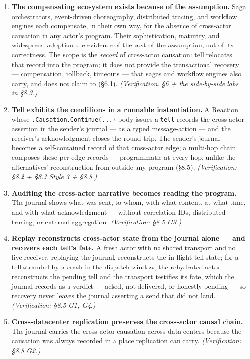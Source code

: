\documentclass[
]{article}
\let\origtexttt\texttt%
\renewcommand{\texttt}[1]{\origtexttt{\seqsplit{#1}}}%
\let\texttt\origtexttt%
\begin{document}
\begin{enumerate}
  remain unchanged; only the historical interpretation of what each
  actor's program is \emph{permitted to say} is removed.
  \emph{(Verification: §7.3.)}
\item
  \textbf{The compensating ecosystem exists because of the assumption.}
  Saga orchestrators, event-driven choreography, distributed tracing,
  and workflow engines each compensate, in their own way, for the
  absence of cross-actor causation in any actor's program. Their
  sophistication, maturity, and widespread adoption are evidence of the
  cost of the assumption, not of its correctness. The scope is the
  \emph{record} of cross-actor causation: tell relocates that record
  into the program; it does not provide the transactional recovery ---
  compensation, rollback, timeouts --- that sagas and workflow engines
  also carry, and does not claim to (§6.1). \emph{(Verification: §6 +
  the side-by-side labs in §8.3.)}
\item
  \textbf{Tell exhibits the conditions in a runnable instantiation.} A
  Reaction whose \texttt{.Causation.Continue(...)} body issues a
  \texttt{tell} records the cross-actor assertion in the sender's
  journal --- as a typed message-action --- and the receiver's
  acknowledgment closes the round-trip. The sender's journal becomes a
  self-contained record of that cross-actor edge; a multi-hop chain
  composes these per-edge records --- programmatic at every hop, unlike
  the alternatives' reconstruction from outside any program (§8.5).
  \emph{(Verification: §8.2 + §8.3 Style 3 + §8.5.)}
\item
  \textbf{Auditing the cross-actor narrative becomes reading the
  program.} The journal shows what was sent, to whom, with what content,
  at what time, and with what acknowledgment --- without correlation
  IDs, distributed tracing, or external aggregation.
  \emph{(Verification: §8.5 G3.)}
\item
  \textbf{Replay reconstructs cross-actor state from the journal alone
  --- and recovers each tell's fate.} A fresh actor with no shared
  transport and no live receiver, replaying the journal, reconstructs
  the in-flight tell state; for a tell stranded by a crash in the
  dispatch window, the rehydrated actor reconstructs the pending tell
  and the transport testifies its fate, which the journal records as a
  verdict --- acked, not-delivered, or honestly pending --- so recovery
  never leaves the journal asserting a send that did not land.
  \emph{(Verification: §8.5 G1, G4.)}
\item
  \textbf{Cross-datacenter replication preserves the cross-actor causal
  chain.} The journal carries the cross-actor causation across data
  centers because the causation was always recorded in a place
  replication can carry. \emph{(Verification: §8.5 G2.)}
\end{enumerate}
\end{document}
